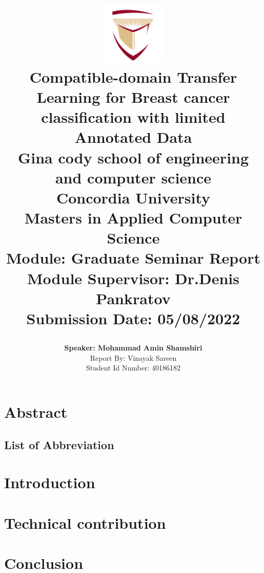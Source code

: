 \documentclass[]{report}
\title{
	\begin{center}
	\includegraphics[width=3cm]{assets/concordia-logo.png} \\
	\vspace{2mm}
	{Compatible-domain Transfer Learning for Breast cancer classification with limited Annotated Data} \\
	\vspace{5mm} %
	\large {
		{Gina cody school of engineering and computer science}\\
		{Concordia University}\\
	}
	\vspace{3mm} %
	\textbf{ Masters in Applied Computer Science}\\
	{\large Module: Graduate Seminar Report}\\
	{\large Module Supervisor: Dr.Denis Pankratov}\\
	{\large Submission Date: 05/08/2022} \\
	\end{center}
}
\author{
	{\textbf{Speaker: Mohammad Amin Shamshiri}}\\
	{\large Report By:  Vinayak Sareen} \\
	{\large Student Id Number:  40186182} \\
}
\date{}
\begin{document}
\maketitle

\chapter*{Abstract}


\pagebreak
\section*{List of Abbreviation}


\tableofcontents
\onehalfspacing
\chapter{Introduction}


% 

\chapter{Technical contribution}



\chapter{Conclusion}





\pagebreak
\thispagestyle{plain}
\end{document}
